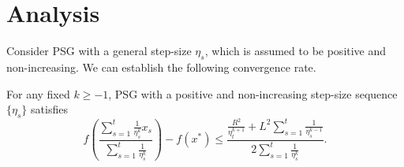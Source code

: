 \section{Analysis}
Consider PSG with a general step-size $\eta_s$, which is
assumed to be positive and non-increasing. We can establish the following convergence rate.
\begin{theorem}\label{Convergence}
For any fixed $k\ge -1$,
PSG with a positive and non-increasing step-size sequence $\{\eta_s\}$ satisfies
	\begin{equation}
		f\left(\frac{\sum_{s=1}^t \frac{1}{\eta_s^k}x_s}{\sum_{s=1}^t \frac{1}{\eta_s^k}}\right)-f(x^*)\le \frac{\frac{R^2}{\eta_t^{k+1}}+ L^2 \sum_{s=1}^t\frac{1}{\eta_s^{k-1}}}{2\sum_{s=1}^t\frac{1}{\eta_s^k}}. \label{bound}
	\end{equation}
\end{theorem}	
